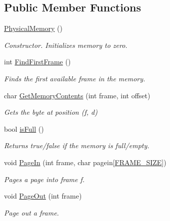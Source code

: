 \subsection*{Public Member Functions}
\begin{DoxyCompactItemize}
\item 
\hyperlink{classPhysicalMemory_ad7fefaba61061c7339164836c6c02eaa}{Physical\+Memory} ()
\begin{DoxyCompactList}\small\item\em Constructor. Initializes memory to zero. \end{DoxyCompactList}\item 
int \hyperlink{classPhysicalMemory_a41ba2824ae9550b68036536d94ae8b32}{Find\+First\+Frame} ()
\begin{DoxyCompactList}\small\item\em Finds the first available frame in the memory. \end{DoxyCompactList}\item 
char \hyperlink{classPhysicalMemory_a2d6b5c45f2377838a76e58b2c083610a}{Get\+Memory\+Contents} (int frame, int offset)
\begin{DoxyCompactList}\small\item\em Gets the byte at position (f, d) \end{DoxyCompactList}\item 
bool \hyperlink{classPhysicalMemory_acde26e332e20349baa6c409b88635258}{is\+Full} ()
\begin{DoxyCompactList}\small\item\em Returns true/false if the memory is full/empty. \end{DoxyCompactList}\item 
void \hyperlink{classPhysicalMemory_a70cb4ae5b23f04cb347ac93cc9fc1028}{Page\+In} (int frame, char pagein\mbox{[}\hyperlink{memory_8h_af9b1b2ba12857a4bf11289dac8c5462d}{F\+R\+A\+M\+E\+\_\+\+S\+I\+ZE}\mbox{]})
\begin{DoxyCompactList}\small\item\em Pages a page into frame f. \end{DoxyCompactList}\item 
void \hyperlink{classPhysicalMemory_a6e1cf83f35ab25e879630783ebaecff3}{Page\+Out} (int frame)
\begin{DoxyCompactList}\small\item\em Page out a frame. \end{DoxyCompactList}\end{DoxyCompactItemize}


